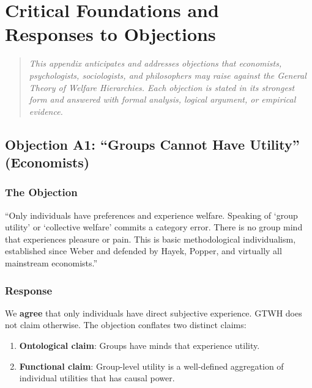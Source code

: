 \documentclass[12pt,a4paper]{article}
\begin{document}
\appendix
\renewcommand{\thesection}{\Alph{section}}

\newpage
\section{Critical Foundations and Responses to Objections}
\label{app:critical}

\begin{quote}
\textit{This appendix anticipates and addresses objections that economists, 
psychologists, sociologists, and philosophers may raise against the General 
Theory of Welfare Hierarchies. Each objection is stated in its strongest form 
and answered with formal analysis, logical argument, or empirical evidence.}
\end{quote}

\subsection{Objection A1: ``Groups Cannot Have Utility'' (Economists)}
\label{app:groups-utility}

\subsubsection{The Objection}

\begin{tcolorbox}[colback=red!5!white, colframe=red!75!black, title=Economist's Objection]
``Only individuals have preferences and experience welfare. Speaking of 
`group utility' or `collective welfare' commits a category error. There is 
no group mind that experiences pleasure or pain. This is basic methodological 
individualism, established since Weber and defended by Hayek, Popper, and 
virtually all mainstream economists.''
\end{tcolorbox}

\subsubsection{Response}

We \textbf{agree} that only individuals have direct subjective experience. 
GTWH does not claim otherwise. The objection conflates two distinct claims:

\begin{enumerate}
\item \textbf{Ontological claim}: Groups have minds that experience utility.
\item \textbf{Functional claim}: Group-level utility is a well-defined aggregation 
of individual utilities that has causal power.
\end{enumerate}
\end{document}
